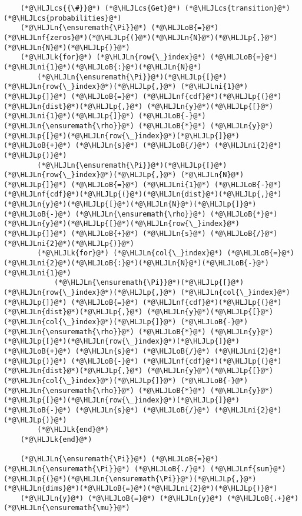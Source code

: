 \documentclass[12pt,a4paper]{article}
\newcommand{\HLJLk}[1]{\textcolor[RGB]{148,91,176}{\textbf{#1}}}
\newcommand{\HLJLn}[1]{#1}
\newcommand{\HLJLnf}[1]{\textcolor[RGB]{66,102,213}{#1}}
\newcommand{\HLJLni}[1]{\textcolor[RGB]{59,151,46}{#1}}
\newcommand{\HLJLoB}[1]{\textcolor[RGB]{102,102,102}{\textbf{#1}}}
\newcommand{\HLJLp}[1]{#1}
\newcommand{\HLJLcs}[1]{\textcolor[RGB]{153,153,119}{\textit{#1}}}
\begin{document}
\begin{lstlisting}
    (*@\HLJLcs{{\#}}@*) (*@\HLJLcs{Get}@*) (*@\HLJLcs{transition}@*) (*@\HLJLcs{probabilities}@*)
    (*@\HLJLn{\ensuremath{\Pi}}@*) (*@\HLJLoB{=}@*) (*@\HLJLnf{zeros}@*)(*@\HLJLp{(}@*)(*@\HLJLn{N}@*)(*@\HLJLp{,}@*) (*@\HLJLn{N}@*)(*@\HLJLp{)}@*)
    (*@\HLJLk{for}@*) (*@\HLJLn{row{\_}index}@*) (*@\HLJLoB{=}@*) (*@\HLJLni{1}@*)(*@\HLJLoB{:}@*)(*@\HLJLn{N}@*)
        (*@\HLJLn{\ensuremath{\Pi}}@*)(*@\HLJLp{[}@*)(*@\HLJLn{row{\_}index}@*)(*@\HLJLp{,}@*) (*@\HLJLni{1}@*)(*@\HLJLp{]}@*) (*@\HLJLoB{=}@*) (*@\HLJLnf{cdf}@*)(*@\HLJLp{(}@*)(*@\HLJLn{dist}@*)(*@\HLJLp{,}@*) (*@\HLJLn{y}@*)(*@\HLJLp{[}@*)(*@\HLJLni{1}@*)(*@\HLJLp{]}@*) (*@\HLJLoB{-}@*) (*@\HLJLn{\ensuremath{\rho}}@*) (*@\HLJLoB{*}@*) (*@\HLJLn{y}@*)(*@\HLJLp{[}@*)(*@\HLJLn{row{\_}index}@*)(*@\HLJLp{]}@*) (*@\HLJLoB{+}@*) (*@\HLJLn{s}@*) (*@\HLJLoB{/}@*) (*@\HLJLni{2}@*)(*@\HLJLp{)}@*)
        (*@\HLJLn{\ensuremath{\Pi}}@*)(*@\HLJLp{[}@*)(*@\HLJLn{row{\_}index}@*)(*@\HLJLp{,}@*) (*@\HLJLn{N}@*)(*@\HLJLp{]}@*) (*@\HLJLoB{=}@*) (*@\HLJLni{1}@*) (*@\HLJLoB{-}@*) (*@\HLJLnf{cdf}@*)(*@\HLJLp{(}@*)(*@\HLJLn{dist}@*)(*@\HLJLp{,}@*) (*@\HLJLn{y}@*)(*@\HLJLp{[}@*)(*@\HLJLn{N}@*)(*@\HLJLp{]}@*) (*@\HLJLoB{-}@*) (*@\HLJLn{\ensuremath{\rho}}@*) (*@\HLJLoB{*}@*) (*@\HLJLn{y}@*)(*@\HLJLp{[}@*)(*@\HLJLn{row{\_}index}@*)(*@\HLJLp{]}@*) (*@\HLJLoB{+}@*) (*@\HLJLn{s}@*) (*@\HLJLoB{/}@*) (*@\HLJLni{2}@*)(*@\HLJLp{)}@*)
        (*@\HLJLk{for}@*) (*@\HLJLn{col{\_}index}@*) (*@\HLJLoB{=}@*) (*@\HLJLni{2}@*)(*@\HLJLoB{:}@*)(*@\HLJLn{N}@*)(*@\HLJLoB{-}@*)(*@\HLJLni{1}@*)
            (*@\HLJLn{\ensuremath{\Pi}}@*)(*@\HLJLp{[}@*)(*@\HLJLn{row{\_}index}@*)(*@\HLJLp{,}@*) (*@\HLJLn{col{\_}index}@*)(*@\HLJLp{]}@*) (*@\HLJLoB{=}@*) (*@\HLJLnf{cdf}@*)(*@\HLJLp{(}@*)(*@\HLJLn{dist}@*)(*@\HLJLp{,}@*) (*@\HLJLn{y}@*)(*@\HLJLp{[}@*)(*@\HLJLn{col{\_}index}@*)(*@\HLJLp{]}@*) (*@\HLJLoB{-}@*) (*@\HLJLn{\ensuremath{\rho}}@*) (*@\HLJLoB{*}@*) (*@\HLJLn{y}@*)(*@\HLJLp{[}@*)(*@\HLJLn{row{\_}index}@*)(*@\HLJLp{]}@*) (*@\HLJLoB{+}@*) (*@\HLJLn{s}@*) (*@\HLJLoB{/}@*) (*@\HLJLni{2}@*)(*@\HLJLp{)}@*) (*@\HLJLoB{-}@*) (*@\HLJLnf{cdf}@*)(*@\HLJLp{(}@*)(*@\HLJLn{dist}@*)(*@\HLJLp{,}@*) (*@\HLJLn{y}@*)(*@\HLJLp{[}@*)(*@\HLJLn{col{\_}index}@*)(*@\HLJLp{]}@*) (*@\HLJLoB{-}@*) (*@\HLJLn{\ensuremath{\rho}}@*) (*@\HLJLoB{*}@*) (*@\HLJLn{y}@*)(*@\HLJLp{[}@*)(*@\HLJLn{row{\_}index}@*)(*@\HLJLp{]}@*) (*@\HLJLoB{-}@*) (*@\HLJLn{s}@*) (*@\HLJLoB{/}@*) (*@\HLJLni{2}@*)(*@\HLJLp{)}@*)
        (*@\HLJLk{end}@*)
    (*@\HLJLk{end}@*)

    (*@\HLJLn{\ensuremath{\Pi}}@*) (*@\HLJLoB{=}@*) (*@\HLJLn{\ensuremath{\Pi}}@*) (*@\HLJLoB{./}@*) (*@\HLJLnf{sum}@*)(*@\HLJLp{(}@*)(*@\HLJLn{\ensuremath{\Pi}}@*)(*@\HLJLp{,}@*) (*@\HLJLn{dims}@*)(*@\HLJLoB{=}@*)(*@\HLJLni{2}@*)(*@\HLJLp{)}@*)
    (*@\HLJLn{y}@*) (*@\HLJLoB{=}@*) (*@\HLJLn{y}@*) (*@\HLJLoB{.+}@*) (*@\HLJLn{\ensuremath{\mu}}@*)


\end{lstlisting}
\end{document}
